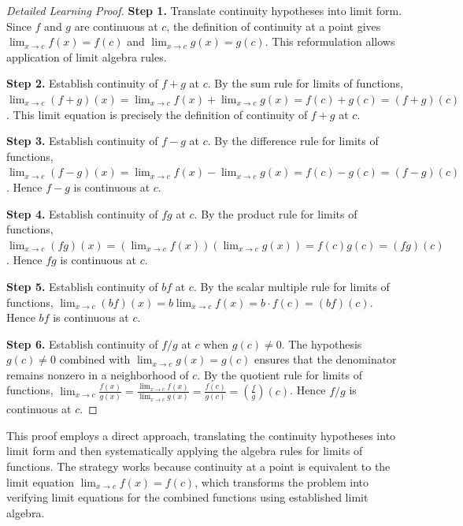 \begin{proof}[Detailed Learning Proof]
\LRAProofBodyStart

\textbf{Step 1.} Translate continuity hypotheses into limit form. Since $f$ and $g$ are continuous at $c$, the definition of continuity at a point gives $\lim_{x\to c} f(x)=f(c)$ and $\lim_{x\to c} g(x)=g(c)$. This reformulation allows application of limit algebra rules.

\textbf{Step 2.} Establish continuity of $f+g$ at $c$. By the sum rule for limits of functions, $\lim_{x\to c} (f+g)(x) = \lim_{x\to c} f(x) + \lim_{x\to c} g(x) = f(c) + g(c) = (f+g)(c)$. This limit equation is precisely the definition of continuity of $f+g$ at $c$.

\textbf{Step 3.} Establish continuity of $f-g$ at $c$. By the difference rule for limits of functions, $\lim_{x\to c} (f-g)(x) = \lim_{x\to c} f(x) - \lim_{x\to c} g(x) = f(c) - g(c) = (f-g)(c)$. Hence $f-g$ is continuous at $c$.

\textbf{Step 4.} Establish continuity of $fg$ at $c$. By the product rule for limits of functions, $\lim_{x\to c} (fg)(x) = \left(\lim_{x\to c} f(x)\right) \left(\lim_{x\to c} g(x)\right) = f(c)g(c) = (fg)(c)$. Hence $fg$ is continuous at $c$.

\textbf{Step 5.} Establish continuity of $bf$ at $c$. By the scalar multiple rule for limits of functions, $\lim_{x\to c} (bf)(x) = b \lim_{x\to c} f(x) = b \cdot f(c) = (bf)(c)$. Hence $bf$ is continuous at $c$.

\textbf{Step 6.} Establish continuity of $f/g$ at $c$ when $g(c) \neq 0$. The hypothesis $g(c) \neq 0$ combined with $\lim_{x\to c} g(x) = g(c)$ ensures that the denominator remains nonzero in a neighborhood of $c$. By the quotient rule for limits of functions, $\lim_{x\to c} \frac{f(x)}{g(x)} = \frac{\lim_{x\to c} f(x)}{\lim_{x\to c} g(x)} = \frac{f(c)}{g(c)} = \left(\frac{f}{g}\right)(c)$. Hence $f/g$ is continuous at $c$.
\end{proof}

\begin{remark*}
This proof employs a direct approach, translating the continuity hypotheses into limit form and then systematically applying the algebra rules for limits of functions. The strategy works because continuity at a point is equivalent to the limit equation $\lim_{x \to c} f(x) = f(c)$, which transforms the problem into verifying limit equations for the combined functions using established limit algebra.
\end{remark*}

